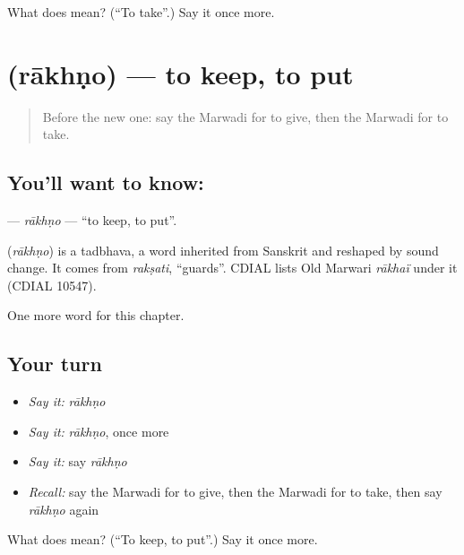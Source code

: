 \begin{tcolorbox}[breakable,colback=teal!4,colframe=teal!35!black,title={Before you move on}]
What does  mean? (\textquotedblleft{}To take\textquotedblright{}.) Say it once more.
\end{tcolorbox}
\section[\texorpdfstring{\mw{राखणो} (rākhṇo)}{राखणो (rākhṇo)}]{ (rākhṇo) — to keep, to put}

\label{lesson:MW-C53-rakhno}



\begin{quote}
Before the new one: say the Marwadi for to give, then the Marwadi for to take.
\end{quote}

\subsection*{You'll want to know: }
\textbf{} — \emph{rākhṇo} — \textquotedblleft{}to keep, to put\textquotedblright{}.

\begin{cousinweb}
\textbf{} (\emph{rākhṇo}) is a tadbhava, a word inherited from Sanskrit and reshaped by sound change. It comes from \emph{rakṣati}, \textquotedblleft{}guards\textquotedblright{}. CDIAL lists Old Marwari \emph{rākhaï} under it (CDIAL 10547).
\end{cousinweb}

\begin{grammarlens}[title={What you've built}]
One more word for this chapter.
\end{grammarlens}

\subsection*{Your turn}
\begin{itemize}
\raggedright
  \item \emph{Say it:} \emph{rākhṇo}
  \item \emph{Say it:} \emph{rākhṇo}, once more
  \item \emph{Say it:} say \emph{rākhṇo}
  \item \emph{Recall:} say the Marwadi for to give, then the Marwadi for to take, then say \emph{rākhṇo} again
\end{itemize}

\begin{tcolorbox}[breakable,colback=teal!4,colframe=teal!35!black,title={Before you move on}]
What does  mean? (\textquotedblleft{}To keep, to put\textquotedblright{}.) Say it once more.
\end{tcolorbox}
